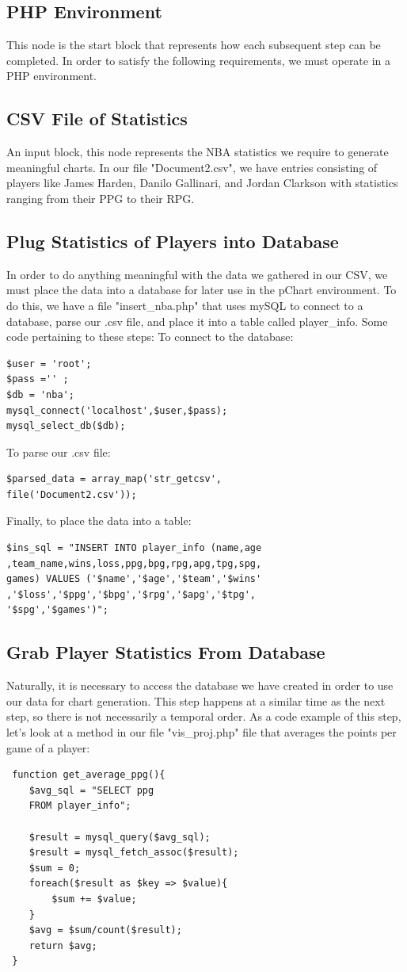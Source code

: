 \documentclass[journal]{vgtc}                %
\begin{document}
\subsection{PHP Environment}
This node is the start block that represents how each subsequent step can be completed. In order to satisfy the following requirements, we must operate in a PHP environment.
\subsection{CSV File of Statistics}
An input block, this node represents the NBA statistics we require to generate meaningful charts. In our file "Document2.csv", we have entries consisting of players like James Harden, Danilo Gallinari, and Jordan Clarkson with statistics ranging from their PPG to their RPG.
\subsection{Plug Statistics of Players into Database}
In order to do anything meaningful with the data we gathered in our CSV, we must place the data into a database for later use in the pChart environment. To do this, we have a file "insert\_nba.php" that uses mySQL to connect to a database, parse our .csv file, and place it into a table called player\_info. Some code pertaining to these steps:
To connect to the database:
\begin{lstlisting}
$user = 'root';
$pass ='' ; 
$db = 'nba';
mysql_connect('localhost',$user,$pass);
mysql_select_db($db);
\end{lstlisting}
To parse our .csv file:
\begin{lstlisting}
$parsed_data = array_map('str_getcsv',
file('Document2.csv'));
\end{lstlisting}
Finally, to place the data into a table:
\begin{lstlisting}
$ins_sql = "INSERT INTO player_info (name,age
,team_name,wins,loss,ppg,bpg,rpg,apg,tpg,spg,
games) VALUES ('$name','$age','$team','$wins'
,'$loss','$ppg','$bpg','$rpg','$apg','$tpg',
'$spg','$games')";
\end{lstlisting}

\subsection{Grab Player Statistics From Database}
Naturally, it is necessary to access the database we have created in order to use our data for chart generation. This step happens at a similar time as the next step, so there is not necessarily a temporal order. As a code example of this step, let's look at a method in our file "vis\_proj.php" file that averages the points per game of a player:
\begin{lstlisting}
 function get_average_ppg(){
 	$avg_sql = "SELECT ppg 
	FROM player_info";
 	
	$result = mysql_query($avg_sql);
 	$result = mysql_fetch_assoc($result);
 	$sum = 0;
 	foreach($result as $key => $value){
 		$sum += $value;
 	}
 	$avg = $sum/count($result);
  	return $avg;
 }
\end{lstlisting}
\end{document}
